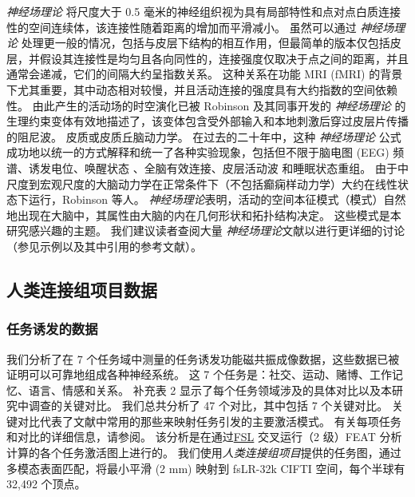 \documentclass[lang=cn,a4paper,newtx]{elegantpaper}
\begin{document}
\textit{神经场理论} 将尺度大于 0.5 毫米的神经组织视为具有局部特性和点对点白质连接性的空间连续体，该连接性随着距离的增加而平滑减小。
虽然可以通过 \textit{神经场理论} 处理更一般的情况，包括与皮层下结构的相互作用\cite{robinson2005multiscale,sanz2018nftsim}，但最简单的版本仅包括皮层，并假设其连接性是均匀且各向同性的，连接强度仅取决于点之间的距离，并且通常会递减，它们的间隔大约呈指数关系\cite{deco2008dynamic,braitenberg2013cortex,henderson2014relations,robinson2019physical}。
这种关系在功能 MRI (fMRI) 的背景下尤其重要，其中动态相对较慢，并且活动连接的强度具有大约指数\cite{braitenberg2013cortex,robinson2019physical,robinson2012interrelating}的空间依赖性。
由此产生的活动场的时空演化已被 Robinson 及其同事开发的 \textit{神经场理论} 的生理约束变体有效地描述了\cite{beurle1956properties,da1976models,jirsa1996field,robinson1997propagation,nunez1974brain}，该变体包含受外部输入和本地刺激后穿过皮层片传播的阻尼波。
皮质或皮质丘脑动力学。
在过去的二十年中，这种 \textit{神经场理论} 公式成功地以统一的方式解释和统一了各种实验现象，包括但不限于脑电图 (EEG) 频谱\cite{robinson2001prediction,pang2018neural}、诱发电位\cite{rennie2002unified,mukta2020evoked}、唤醒状态\cite{abeysuriya2015physiologically,assadzadeh2018necessity} 、全脑有效连接\cite{robinson2012interrelating}、皮层活动波\cite{gabay2018dynamics} 和睡眠状态重组\cite{robinson2005multiscale}。
由于中尺度到宏观尺度的大脑动力学在正常条件下（不包括癫痫样动力学）\cite{robinson2019physical}大约在线性状态下运行，Robinson 等人。
\textit{神经场理论}表明，活动的空间本征模式（模式）自然地出现在大脑中\cite{wang2016brain,roberts2017consistency}，其属性由大脑的内在几何形状和拓扑结构决定\cite{preti2019decoupling,gabay2018dynamics}。
这些模式是本研究感兴趣的主题。
我们建议读者查阅大量 \textit{神经场理论}文献以进行更详细的讨论（参见示例\cite{wright1995simulation,jirsa1996field,robinson1997propagation,robinson2016eigenmodes,gabay2017cortical,wang2016brain,honey2007network,van2013wu,glasser2016multi,naze2021robustness}以及其中引用的参考文献）。



\subsection{人类连接组项目数据} \label{sec:sup_2}

\subsubsection{任务诱发的数据} \label{sec:sup_2_1}

我们分析了在 7 个任务域中测量的任务诱发功能磁共振成像数据，这些数据已被证明可以可靠地组成各种神经系统\cite{barch2013function}。
这 7 个任务是：社交、运动、赌博、工作记忆、语言、情感和关系。
补充表 2 显示了每个任务领域涉及的具体对比以及本研究中调查的关键对比。
我们总共分析了 47 个对比，其中包括 7 个关键对比。
关键对比代表了文献中常用的那些来映射任务引发的主要激活模式。
有关每项任务和对比的详细信息，请参阅\cite{barch2013function}。
该分析是在通过\href{https://fsl.fmrib.ox.ac.uk/}{FSL} 交叉运行（2 级）FEAT 分析\cite{woolrich2004multilevel}计算的各个任务激活图上进行的。
我们使用\textit{人类连接组项目}提供的任务图，通过多模态表面匹配\cite{robinson2018multimodal}，将最小平滑 (2 mm) 映射到 fsLR-32k CIFTI 空间，每个半球有 32,492 个顶点。
\end{document}
